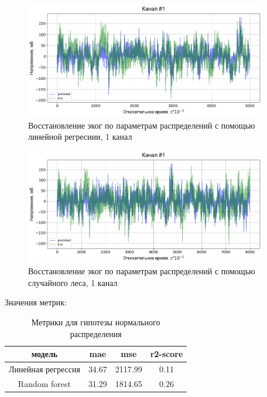 \documentclass{mipt-thesis-bs}
\begin{document}
\begin{figure}
\begin{center}
	\includegraphics[width=300pt,height=\textheight,keepaspectratio]{imgs/ecog_by_params_lr.png}
	\caption{Восстановление эког по параметрам распределений с помощью линейной регресиии, 1 канал}	
	\label{fig:lr ecog}
	\end{center}
\end{figure}

\begin{figure}
\begin{center}
\includegraphics[width=300pt,height=\textheight,keepaspectratio]{imgs/ecog_by_params_rf.png}
\caption{Восстановление эког по параметрам распределений с помощью случайного леса, 1 канал}	
	\label{fig:rf ecog}
	\end{center}
\end{figure}


Значения метрик:
\begin{table}[h]
  
  \centering
    \begin{tabular}{ | c | c | c | c | }
	\hline
	модель&mae & mse & r2-score \\ \hline
	Линейная регрессия &34.67 & 2117.99 & 0.11 \\
	Random forest &31.29 & 1814.65 & 0.26\\
	\hline
	\end{tabular}
\caption{Метрики для гипотезы нормального распределения}
\label{table:lr/rf ecog}
\end{table}
\end{document}
